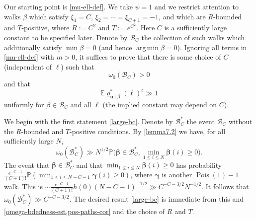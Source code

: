 \documentclass[11pt,reqno]{amsart}
\DeclareMathOperator*{\argmin}{arg\,min}
\numberwithin{equation}{section}
\theoremstyle{definition}
\theoremstyle{remark}
\newcommand{\mb}{\mathbb}
\newcommand{\mbf}{\mathbf}
\newcommand\Pois{\operatorname{Pois}}
\def\boldbeta{\boldsymbol\beta}
\def\boldgamma{\boldsymbol\gamma}
\renewcommand{\le}{\leqslant}
\renewcommand{\ge}{\geqslant}
\begin{document}
Our starting point is \cref{mu-ell-def}. We take $\psi = 1$ and we restrict attention to walks $\beta$ which satisfy $\xi_1 = C$, $\xi_2 = \cdots = \xi_{C+1} = -1$, and which are $R$-bounded and $T$-positive, where $R := C^2$ and $T := e^{C^2}$.  Here $C$ is a sufficiently large constant to be specified later. Denote by $\mathscr{B}_C$ the collection of such walks which additionally satisfy $\min \beta = 0$ (and hence $\argmin \beta = 0$). Ignoring all terms in \cref{mu-ell-def} with $m > 0$, it suffices to prove that there is some choice of $C$ (independent of $\ell$) such that 
\begin{equation}\label{large-bc} \omega_0(\mathscr{B}_C) > 0\end{equation}
and that 
\begin{equation}\label{main-rho-lower} \mb{E} \varrho^*_{\mbf{u} \mid \beta}(\ell)^c \gg 1\end{equation} uniformly for $\beta \in \mathscr{B}_C$ and all $\ell$ (the implied constant may depend on $C$).


We begin with the first statement \cref{large-bc}. Denote by $\mathscr{B}_C^*$ the event $\mathscr{B}_C$ without the $R$-bounded and $T$-positive conditions. By \cref{lemma7.2} we have, for all sufficiently large $N$,
\[ \omega_0(\mathscr{B}^*_C) \gg N^{1/2} \mb{P}\big( \boldbeta \in \mathscr{B}^*_C ,  \min_{1 \le i \le N} \boldbeta(i) \ge 0\big) .\]   The event that $\boldbeta \in \mathscr{B}^*_C$ and that $\min_{1 \le i \le N} \boldbeta(i) \ge 0$ has probability $\frac{e^{-C-1}}{(C+1)!} \mb{P}(\min_{1 \le i \le N - C - 1} \boldgamma(i) \ge 0)$, where $\boldgamma$ is another $\Pois(1) - 1$ walk. This is $\sim \frac{e^{-C-1}}{(C+1)!}h(0) (N - C - 1)^{-1/2} \gg C^{-C - 3/2} N^{-1/2}$. It follows that $\omega_0(\mathscr{B}_C^*) \gg C^{-C-3/2}$. The desired result \cref{large-bc} is immediate from this and \cref{omega-bdedness-est,pos-paths-cor} and the choice of $R$ and $T$.
\end{document}
